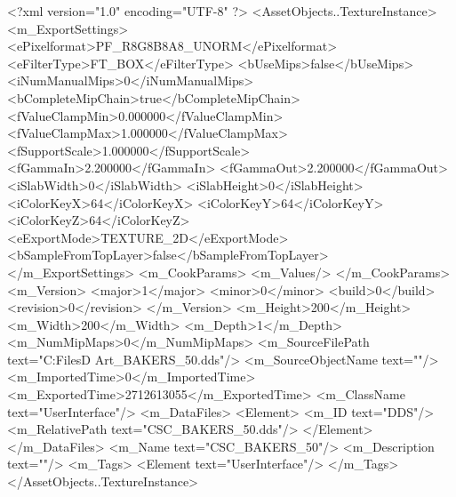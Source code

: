 <?xml version="1.0" encoding="UTF-8" ?>
<AssetObjects..TextureInstance>
	<m_ExportSettings>
		<ePixelformat>PF_R8G8B8A8_UNORM</ePixelformat>
		<eFilterType>FT_BOX</eFilterType>
		<bUseMips>false</bUseMips>
		<iNumManualMips>0</iNumManualMips>
		<bCompleteMipChain>true</bCompleteMipChain>
		<fValueClampMin>0.000000</fValueClampMin>
		<fValueClampMax>1.000000</fValueClampMax>
		<fSupportScale>1.000000</fSupportScale>
		<fGammaIn>2.200000</fGammaIn>
		<fGammaOut>2.200000</fGammaOut>
		<iSlabWidth>0</iSlabWidth>
		<iSlabHeight>0</iSlabHeight>
		<iColorKeyX>64</iColorKeyX>
		<iColorKeyY>64</iColorKeyY>
		<iColorKeyZ>64</iColorKeyZ>
		<eExportMode>TEXTURE_2D</eExportMode>
		<bSampleFromTopLayer>false</bSampleFromTopLayer>
	</m_ExportSettings>
	<m_CookParams>
		<m_Values/>
	</m_CookParams>
	<m_Version>
		<major>1</major>
		<minor>0</minor>
		<build>0</build>
		<revision>0</revision>
	</m_Version>
	<m_Height>200</m_Height>
	<m_Width>200</m_Width>
	<m_Depth>1</m_Depth>
	<m_NumMipMaps>0</m_NumMipMaps>
	<m_SourceFilePath text="C:\Users\Shadow\Desktop\Working Files\2D Art\Quarters\Bakers\CSC_BAKERS_50.dds"/>
	<m_SourceObjectName text=""/>
	<m_ImportedTime>0</m_ImportedTime>
	<m_ExportedTime>2712613055</m_ExportedTime>
	<m_ClassName text="UserInterface"/>
	<m_DataFiles>
		<Element>
			<m_ID text="DDS"/>
			<m_RelativePath text="CSC_BAKERS_50.dds"/>
		</Element>
	</m_DataFiles>
	<m_Name text="CSC_BAKERS_50"/>
	<m_Description text=""/>
	<m_Tags>
		<Element text="UserInterface"/>
	</m_Tags>
</AssetObjects..TextureInstance>

